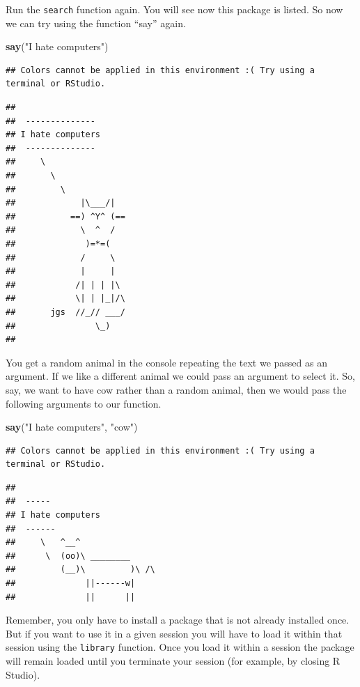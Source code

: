 \documentclass[]{book}
\newenvironment{Shaded}{\begin{snugshade}}{\end{snugshade}}
\newcommand{\KeywordTok}[1]{\textcolor[rgb]{0.13,0.29,0.53}{\textbf{#1}}}
\newcommand{\NormalTok}[1]{#1}
\newcommand{\StringTok}[1]{\textcolor[rgb]{0.31,0.60,0.02}{#1}}
\theoremstyle{definition}
\theoremstyle{definition}
\theoremstyle{definition}
\theoremstyle{remark}
\begin{document}
Run the \texttt{search} function again. You will see now this package is
listed. So now we can try using the function ``say'' again.

\begin{Shaded}
\begin{Highlighting}[]
\KeywordTok{say}\NormalTok{(}\StringTok{"I hate computers"}\NormalTok{)}
\end{Highlighting}
\end{Shaded}

\begin{verbatim}
## Colors cannot be applied in this environment :( Try using a terminal or RStudio.
\end{verbatim}

\begin{verbatim}
## 
##  -------------- 
## I hate computers 
##  --------------
##     \
##       \
##         \
##             |\___/|
##           ==) ^Y^ (==
##             \  ^  /
##              )=*=(
##             /     \
##             |     |
##            /| | | |\
##            \| | |_|/\
##       jgs  //_// ___/
##                \_)
## 
\end{verbatim}

You get a random animal in the console repeating the text we passed as
an argument. If we like a different animal we could pass an argument to
select it. So, say, we want to have cow rather than a random animal,
then we would pass the following arguments to our function.

\begin{Shaded}
\begin{Highlighting}[]
\KeywordTok{say}\NormalTok{(}\StringTok{"I hate computers"}\NormalTok{, }\StringTok{"cow"}\NormalTok{)}
\end{Highlighting}
\end{Shaded}

\begin{verbatim}
## Colors cannot be applied in this environment :( Try using a terminal or RStudio.
\end{verbatim}

\begin{verbatim}
## 
##  ----- 
## I hate computers 
##  ------ 
##     \   ^__^ 
##      \  (oo)\ ________ 
##         (__)\         )\ /\ 
##              ||------w|
##              ||      ||
\end{verbatim}

Remember, you only have to install a package that is not already
installed once. But if you want to use it in a given session you will
have to load it within that session using the \texttt{library} function.
Once you load it within a session the package will remain loaded until
you terminate your session (for example, by closing R Studio).
\end{document}
